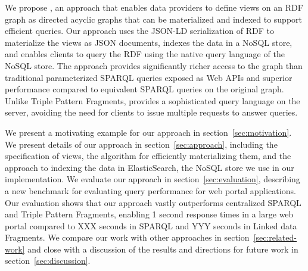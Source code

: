 We propose \ldviews, an approach that enables data providers to define views on an RDF graph as directed acyclic graphs that can be materialized and indexed to support efficient queries.
Our approach uses the JSON-LD serialization of RDF \cite{Lanthaler:2012:UJC:2307819.2307827} to materialize the views as JSON documents, indexes the data in a NoSQL store, and enables clients to query the RDF using the native query language of the NoSQL store.
%
The approach provides significantly richer access to the graph than traditional parameterized SPARQL queries exposed as Web APIs and superior performance compared to equivalent SPARQL queries on the original graph.
Unlike Triple Pattern Fragments, \ldviews provides a sophisticated query language on the server, avoiding the need for clients to issue multiple requests to answer queries. 

We present a motivating example for our approach in section~\ref{sec:motivation}.
We present details of our approach in section~\ref{sec:approach}, including the specification of views, the algorithm for efficiently materializing them, and the approach to indexing the data in ElasticSearch, the NoSQL store we use in our implementation.
We evaluate our approach in section~\ref{sec:evaluation}, describing a new benchmark for evaluating query performance for web portal applications. 
Our evaluation shows that our approach vastly outperforms centralized SPARQL and Triple Pattern Fragments, enabling 1 second response times in a large web portal compared to XXX seconds in SPARQL and YYY seconds in Linked data Fragments.
We compare our work with other approaches in section~\ref{sec:related-work} and close with a discussion of the results and directions for future work in section~\ref{sec:discussion}.
